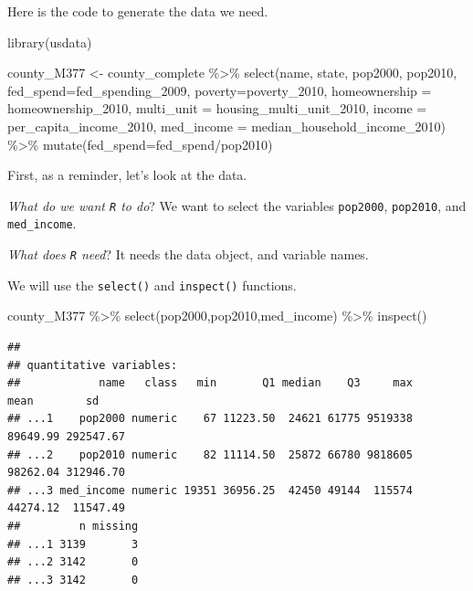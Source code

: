\documentclass[
]{book}
\newenvironment{Shaded}{\begin{snugshade}}{\end{snugshade}}
\newcommand{\AttributeTok}[1]{\textcolor[rgb]{0.77,0.63,0.00}{#1}}
\newcommand{\FunctionTok}[1]{\textcolor[rgb]{0.00,0.00,0.00}{#1}}
\newcommand{\NormalTok}[1]{#1}
\newcommand{\OtherTok}[1]{\textcolor[rgb]{0.56,0.35,0.01}{#1}}
\newcommand{\SpecialCharTok}[1]{\textcolor[rgb]{0.00,0.00,0.00}{#1}}
\begin{document}
Here is the code to generate the data we need.

\begin{Shaded}
\begin{Highlighting}[]
\FunctionTok{library}\NormalTok{(usdata)}
\end{Highlighting}
\end{Shaded}

\begin{Shaded}
\begin{Highlighting}[]
\NormalTok{county\_M377 }\OtherTok{\textless{}{-}}\NormalTok{ county\_complete }\SpecialCharTok{\%\textgreater{}\%} 
  \FunctionTok{select}\NormalTok{(name, state, pop2000, pop2010, }\AttributeTok{fed\_spend=}\NormalTok{fed\_spending\_2009, }\AttributeTok{poverty=}\NormalTok{poverty\_2010, }
         \AttributeTok{homeownership =}\NormalTok{ homeownership\_2010, }\AttributeTok{multi\_unit =}\NormalTok{ housing\_multi\_unit\_2010, }
         \AttributeTok{income =}\NormalTok{ per\_capita\_income\_2010, }\AttributeTok{med\_income =}\NormalTok{ median\_household\_income\_2010) }\SpecialCharTok{\%\textgreater{}\%}
  \FunctionTok{mutate}\NormalTok{(}\AttributeTok{fed\_spend=}\NormalTok{fed\_spend}\SpecialCharTok{/}\NormalTok{pop2010)}
\end{Highlighting}
\end{Shaded}

First, as a reminder, let's look at the data.

\emph{What do we want \texttt{R} to do}? We want to select the variables \texttt{pop2000}, \texttt{pop2010}, and \texttt{med\_income}.

\emph{What does \texttt{R} need}? It needs the data object, and variable names.

We will use the \texttt{select()} and \texttt{inspect()} functions.

\begin{Shaded}
\begin{Highlighting}[]
\NormalTok{county\_M377 }\SpecialCharTok{\%\textgreater{}\%}
  \FunctionTok{select}\NormalTok{(pop2000,pop2010,med\_income) }\SpecialCharTok{\%\textgreater{}\%}
  \FunctionTok{inspect}\NormalTok{()}
\end{Highlighting}
\end{Shaded}

\begin{verbatim}
## 
## quantitative variables:  
##            name   class   min       Q1 median    Q3     max     mean        sd
## ...1    pop2000 numeric    67 11223.50  24621 61775 9519338 89649.99 292547.67
## ...2    pop2010 numeric    82 11114.50  25872 66780 9818605 98262.04 312946.70
## ...3 med_income numeric 19351 36956.25  42450 49144  115574 44274.12  11547.49
##         n missing
## ...1 3139       3
## ...2 3142       0
## ...3 3142       0
\end{verbatim}
\end{document}
